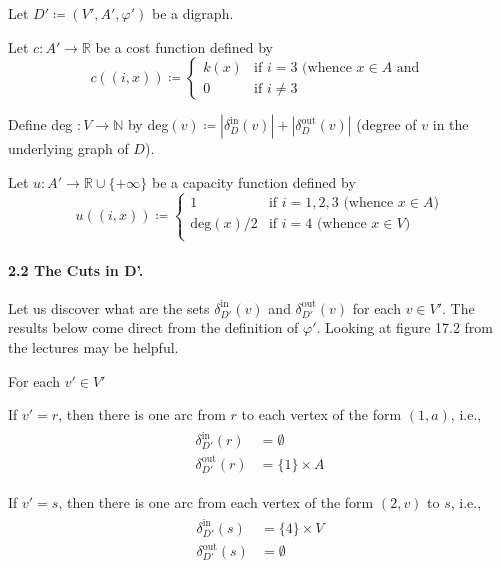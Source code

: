\documentclass[a4paper,10pt, leqno]{article}
\theoremstyle{definition}
\begin{document}
Let $D' \coloneqq (V', A', \varphi') $ be a digraph.

Let $c : A' \to \mathbb{R}$ be a cost function defined by
$$
c((i, x)) \coloneqq
\left\{
	\begin{array}{ll}
		k(x)  & \mbox{if } i = 3 \text{ (whence } x \in A \text{ and } \\
		0  & \mbox{if } i \neq 3
	\end{array}
\right.
$$

Define deg $: V \to \mathbb{N}$ by deg$(v) \coloneqq |\delta_D^\text{in}(v)| + |\delta_D^\text{out}(v)|$ (degree of $v$ in the underlying graph of $D$).

Let $u : A' \to \mathbb{R} \cup \{+\infty\}$ be a capacity function defined by
$$
u((i, x)) \coloneqq
\left\{
	\begin{array}{ll}
		1  & \mbox{if } i = 1, 2, 3 \text{ (whence } x \in A) \\
		\text{deg}(x)/2 & \mbox{if } i = 4 \text{ (whence } x \in V) \\
	\end{array}
\right.
$$

\paragraph{\textbf{2.2 The Cuts in D'.}}


Let us discover what are the sets $\delta_{D'}^\text{in}(v)$ and $\delta_{D'}^\text{out}(v)$ for each $v \in V'$. The results below come direct from the definition of $\varphi'$. Looking at figure 17.2 from the lectures may be helpful.

For each $v' \in V'$

If $v' = r$, then there is one arc from $r$ to each vertex of the form $(1, a)$, i.e.,
\begin{align*}
 \tag{2.1}
 \begin{split}
 \delta_{D'}^\text{in}(r) &= \emptyset \\
 \delta_{D'}^\text{out}(r) &= \{1\} \times A
 \end{split}
\end{align*}

If $v' = s$, then there is one arc from each vertex of the form $(2, v)$ to $s$, i.e.,
\begin{align*}
 \tag{2.2}
 \begin{split}
 \delta_{D'}^\text{in}(s) &= \{4\} \times V \\
 \delta_{D'}^\text{out}(s) &= \emptyset
 \end{split}
\end{align*}
\end{document}
